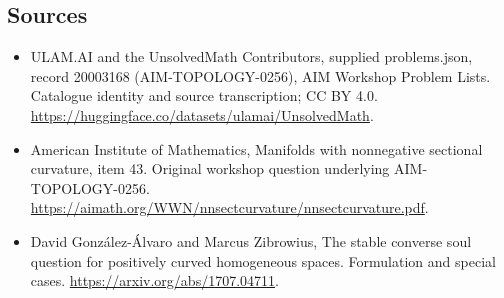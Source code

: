 \documentclass[11pt,a4paper]{article}
\begin{document}
\subsection{Sources}
\begin{itemize}
\item[S1] ULAM.AI and the UnsolvedMath Contributors, supplied problems.json, record 20003168 (AIM-TOPOLOGY-0256), AIM Workshop Problem Lists. Catalogue identity and source transcription; CC BY 4.0.
\url{https://huggingface.co/datasets/ulamai/UnsolvedMath}.
\item[S2] American Institute of Mathematics, Manifolds with nonnegative sectional curvature, item 43. Original workshop question underlying AIM-TOPOLOGY-0256.
\url{https://aimath.org/WWN/nnsectcurvature/nnsectcurvature.pdf}.
\item[S3] David González-Álvaro and Marcus Zibrowius, The stable converse soul question for positively curved homogeneous spaces. Formulation and special cases.
\url{https://arxiv.org/abs/1707.04711}.
\end{itemize}
\end{document}
